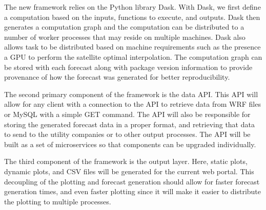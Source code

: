 The new framework relies on the Python library Dask.
With Dask, we first define a computation based on the inputs,
functions to execute, and outputs.
Dask then generates a computation graph and the computation can be
distributed to a number of worker processes that may reside on
multiple machines.
Dask also allows task to be distributed based on machine requirements
such as the presence a GPU to perform the satellite optimal interpolation.
The computation graph can be stored with each forecast along with
package version information to provide provenance of how the forecast
was generated for better reproducibility.

The second primary component of the framework is the data API.
This API will allow for any client with a connection to the API to
retrieve data from WRF files or MySQL with a simple GET command.
The API will also be responsible for storing the generated forecast
data in a proper format, and retrieving that data to send to the
utility companies or to other output processes.
The API will be built as a set of microservices so that components can
be upgraded individually.

The third component of the framework is the output layer.
Here, static plots, dynamic plots, and CSV files will be generated for
the current web portal.
This decoupling of the plotting and forecast generation should allow
for faster forecast generation times, and even faster plotting since
it will make it easier to distribute the plotting to multiple
processes.





